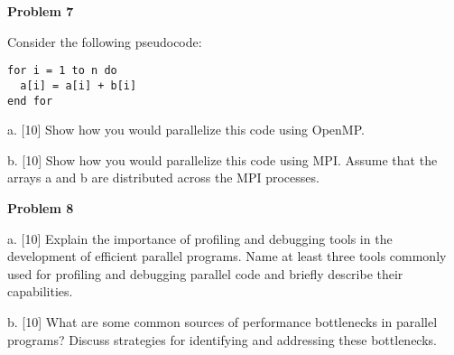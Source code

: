 \documentclass{article}
\begin{document}
\vspace{1cm}

\textbf{Problem 7}

Consider the following pseudocode:

\begin{verbatim}
for i = 1 to n do
  a[i] = a[i] + b[i]
end for
\end{verbatim}

a. [10]  Show how you would parallelize this code using OpenMP.

b. [10]  Show how you would parallelize this code using MPI.  Assume that the arrays a and b are distributed across the MPI processes.

\vspace{1cm}

\textbf{Problem 8}

a. [10] Explain the importance of profiling and debugging tools in the development of efficient parallel programs.  Name at least three tools commonly used for profiling and debugging parallel code and briefly describe their capabilities.

b. [10]  What are some common sources of performance bottlenecks in parallel programs?  Discuss strategies for identifying and addressing these bottlenecks.
\end{document}
